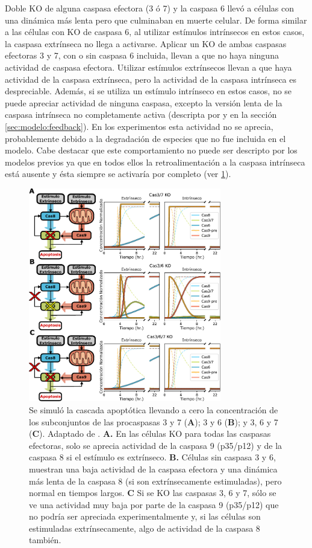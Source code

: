 Doble KO de alguna caspasa efectora (3 ó 7) y la caspasa 6 llevó a células con una dinámica más lenta pero que culminaban en muerte celular. De forma similar a las células con KO de caspasa 6, al utilizar estímulos intrínsecos en estos casos, la caspasa extrínseca no llega a activarse. Aplicar un KO de ambas caspasas efectoras 3 y 7, con o sin caspasa 6 incluida, llevan a que no haya ninguna actividad de caspasa efectora. Utilizar estímulos extrínsecos llevan a que haya actividad de la caspasa extrínseca, pero la actividad de la caspasa intrínseca es despreciable. Además, si se utiliza un estímulo intrínseco en estos casos, no se puede apreciar actividad de ninguna caspasa, excepto la versión lenta de la caspasa intrínseca no completamente activa (descripta por \cite{Rehm2006} y en la sección \ref{sec:modelo:feedback}). En los experimentos esta actividad no se aprecia, probablemente debido a la degradación de especies que no fue incluida en el modelo. Cabe destacar que este comportamiento no puede ser descripto por los modelos previos ya que en todos ellos la retroalimentación a la caspasa intrínseca está ausente y ésta siempre se activaría por completo (ver \cref{fig:KO_dobles}).

\begin{figure}[b!]
    \centering
    \includegraphics[width=0.75\textwidth]{img/cap_4/ko_multis.pdf}
    \caption{\footnotesize{Se simuló la cascada apoptótica llevando a cero la concentración de los subconjuntos de las procaspasas 3 y 7  (\textbf{A}); 3 y 6 (\textbf{B}); y 3, 6 y 7 (\textbf{C}). Adaptado de \cite{Corbat2021}. \textbf{A.} En las células KO para todas las caspasas efectoras, solo se aprecia actividad de la caspasa 9 (p35/p12) y de la caspasa 8 si el estímulo es extrínseco. \textbf{B.} Células sin caspasa 3 y 6, muestran una baja actividad de la caspasa efectora y una dinámica más lenta de la caspasa 8 (si son extrínsecamente estimuladas), pero normal en tiempos largos. \textbf{C} Si se KO las caspasas 3, 6 y 7, sólo se ve una actividad muy baja por parte de la caspasa 9 (p35/p12) que no podría ser apreciada experimentalmente y, si las células son estimuladas extrínsecamente, algo de actividad de la caspasa 8 también.}}
    \label{fig:KO_dobles}
\end{figure}

